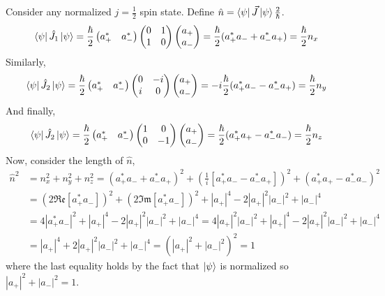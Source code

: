 \documentclass[12pt]{extarticle}
\begin{document}
Consider any normalized $j = \tfrac{1}{2}$ spin state. Define $\hat{n} = \left< \psi \right| \vec{J} \left| \psi \right> \frac{2}{\hbar}$.
\begin{align*}
\left< \psi \right| \hat{J}_1 \left| \psi \right> & = \frac{\hbar}{2}
\begin{pmatrix}
a_{+}^* & a_{-}^* 
\end{pmatrix}
\begin{pmatrix}
0 & 1 \\
1 & 0
\end{pmatrix}
\begin{pmatrix}
a_{+} \\
a_{-}
\end{pmatrix} = \frac{\hbar}{2} (a_{+}^* a_{-} + a_{-}^* a_{+}) = \frac{\hbar}{2} n_x
\end{align*}
Similarly, 
\begin{align*}
\left< \psi \right| \hat{J}_2 \left| \psi \right> & = \frac{\hbar}{2}
\begin{pmatrix}
a_{+}^* & a_{-}^* 
\end{pmatrix}
\begin{pmatrix}
0 & -i \\
i & 0
\end{pmatrix}
\begin{pmatrix}
a_{+} \\
a_{-}
\end{pmatrix} = -i \frac{\hbar}{2} (a_{+}^* a_{-} - a_{-}^* a_{+}) = \frac{\hbar}{2} n_y
\end{align*}
And finally,
\begin{align*}
\left< \psi \right| \hat{J}_2 \left| \psi \right> & = \frac{\hbar}{2}
\begin{pmatrix}
a_{+}^* & a_{-}^* 
\end{pmatrix}
\begin{pmatrix}
1 & 0 \\
0 & -1
\end{pmatrix}
\begin{pmatrix}
a_{+} \\
a_{-}
\end{pmatrix} = \frac{\hbar}{2} (a_{+}^* a_{+} - a_{-}^* a_{-}) = \frac{\hbar}{2} n_z
\end{align*}
Now, consider the length of $\hat{n}$,
\begin{align*}
\hat{n}^2 & = n_x^2 + n_y^2 + n_z^2 = (a_{+}^* a_{-} + a_{-}^* a_{+})^2 + (\tfrac{1}{i} \left[a_{+}^* a_{-} - a_{-}^* a_{+}\right])^2 + (a_{+}^* a_{+} - a_{-}^* a_{-})^2 \\ & = \left(2 \mathfrak{Re}\left[a_{+}^* a_{-}\right] \right)^2 + \left(2 \mathfrak{Im}\left[a_{+}^* a_{-}\right] \right)^2 + |a_{+}|^4 - 2 |a_{+}|^2 |a_{-}|^2 + |a_{-}|^4 \\
& = 4 |a_{+}^* a_{-}|^2 + |a_{+}|^4 - 2 |a_{+}|^2 |a_{-}|^2 + |a_{-}|^4 = 4 |a_{+}|^2 |a_{-}|^2 + |a_{+}|^4 - 2 |a_{+}|^2 |a_{-}|^2 + |a_{-}|^4 \\
& = |a_{+}|^4 + 2 |a_{+}|^2 |a_{-}|^2 + |a_{-}|^4 = (|a_{+}|^2 + |a_{-}|^2)^2 = 1
\end{align*}
where the last equality holds by the fact that $\left| \psi \right>$ is normalized so $|a_{+}|^2 + |a_{-}|^2 = 1$. 
\end{document}
